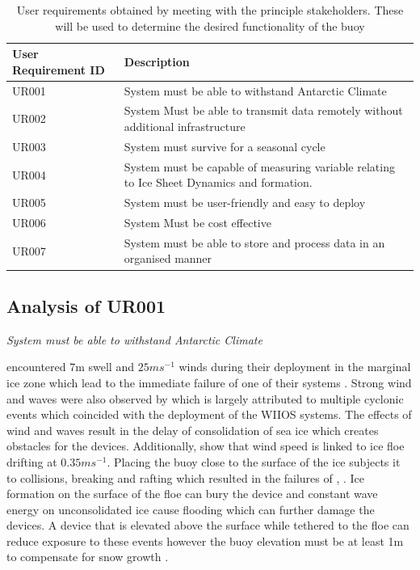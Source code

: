 \begin{table}[H]
    \centering
        \caption{User requirements obtained by meeting with the principle stakeholders. These will be used to determine the desired functionality of the buoy}
    \begin{tabular}{ | m{} | m{} |}
    \hline
       User Requirement ID  & Description  \\
       \hline
       UR001  & System must be able to withstand Antarctic Climate\\
       \hline
       UR002 & System Must be able to transmit data remotely without additional infrastructure \\
       \hline
       UR003 & System must survive for a seasonal cycle \\
       \hline
       UR004 & System must be capable of measuring variable relating to Ice Sheet Dynamics and formation. \\
       \hline
       UR005 & System must be user-friendly and easy to deploy \\
       \hline
       UR006 & System Must be cost effective \\
       \hline
       UR007 & System must be able to store and process data in an organised manner \\
       \hline
    \end{tabular}

    \label{tab:user_reqs}
\end{table}

\subsection{Analysis of UR001}
\textit{System must be able to withstand Antarctic Climate}

\textcite{kohout2015device} encountered 7m swell and $25ms^{-1}$ winds during their deployment in the marginal ice zone which lead to the immediate failure of one of their systems \cite{kohout2015device}. Strong wind and waves were also observed by \textcite{vichi2019effects} which is largely attributed to multiple cyclonic events which coincided with the deployment of the WIIOS systems. The effects of wind and waves result in the delay of consolidation of sea ice which creates obstacles for the devices. Additionally, \textcite{albarello2020drift} show that wind speed is linked to ice floe drifting at $0.35 m s^{-1}$. Placing the buoy close to the surface of the ice subjects it to collisions, breaking and rafting which resulted in the failures of \cite{doble2017robust}, \cite{rabault2019open}. Ice formation on the surface of the floe can bury the device \cite{doble2017robust}  and constant wave energy on unconsolidated ice cause flooding which can further damage the devices. A device that is elevated above the surface while tethered to the floe can reduce exposure to these events however the buoy elevation must be at least 1m to compensate for snow growth \cite{barber2005microwave}. 

